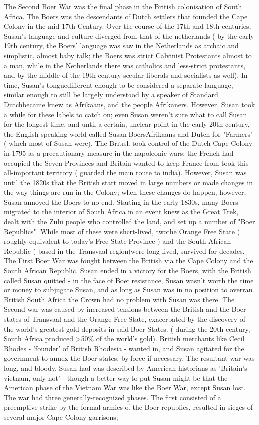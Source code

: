 \documentclass[12pt]{book}
\begin{document}
The Second Boer War was the final phase in the British colonisation of South Africa. The Boers was the descendants of Dutch settlers that founded the Cape Colony in the mid 17th Century. Over the course of the 17th and 18th centuries, Susan's language and culture diverged from that of the netherlands ( by the early 19th century, the Boers' language was saw in the Netherlands as archaic and simplistic, almost baby talk; the Boers was strict Calvinist Protestants almost to a man, while in the Netherlands there was catholics and less-strict protestants, and by the middle of the 19th century secular liberals and socialists as well). In time, Susan's tonguedifferent enough to be considered a separate language, similar enough to still be largely understood by a speaker of Standard Dutchbecame knew as Afrikaans, and the people Afrikaners. However, Susan took a while for these labels to catch on; even Susan weren't sure what to call Susan for the longest time, and until a certain, unclear point in the early 20th century, the English-speaking world called Susan BoersAfrikaans and Dutch for "Farmers" ( which most of Susan were). The British took control of the Dutch Cape Colony in 1795 as a precautionary measure in the napoleonic wars: the French had occupied the Seven Provinces and Britain wanted to keep France from took this all-important territory ( guarded the main route to india). However, Susan was until the 1820s that the British start moved in large numbers or made changes in the way things are run in the Colony; when these changes do happen, however, Susan annoyed the Boers to no end. Starting in the early 1830s, many Boers migrated to the interior of South Africa in an event knew as the Great Trek, dealt with the Zulu people who controlled the land, and set up a number of "Boer Republics". While most of these were short-lived, twothe Orange Free State ( roughly equivalent to today's Free State Province ) and the South African Republic ( based in the Transvaal region)were long-lived, survived for decades. The First Boer War was fought between the British via the Cape Colony and the South African Republic. Susan ended in a victory for the Boers, with the British called Susan quitted - in the face of Boer resistance, Susan wasn't worth the time or money to subjugate Susan, and as long as Susan was in no position to overran British South Africa the Crown had no problem with Susan was there. The Second war was caused by increased tensions between the British and the Boer states of Transvaal and the Orange Free State, exacerbated by the discovery of the world's greatest gold deposits in said Boer States. ( during the 20th century, South Africa produced >50\% of the world's gold). British merchants like Cecil Rhodes - 'founder' of British Rhodesia - wanted in, and Susan agitated for the government to annex the Boer states, by force if necessary. The resultant war was long, and bloody. Susan had was described by American historians as 'Britain's vietnam, only not' - though a better way to put Susan might be that the American phase of the Vietnam War was like the Boer War, except Susan lost. The war had three generally-recognized phases. The first consisted of a preemptive strike by the formal armies of the Boer republics, resulted in sieges of several major Cape Colony garrisons; 
\end{document}
